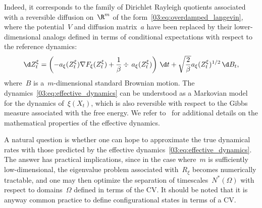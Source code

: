     Indeed, it corresponds to the family of Dirichlet Rayleigh quotients associated with a reversible diffusion on~$\R^m$ of the form~\eqref{03:eq:overdamped_langevin}, where the potential~$V$ and diffusion matrix~$a$ have been replaced by their lower-dimensional analogs defined in terms of conditional expectations with respect to the reference dynamics:
    \begin{equation}
        \label{03:eq:effective_dynamics}
        \d Z_t^\xi = \left(-a_\xi(Z_t^\xi)\nabla F_\xi(Z^\xi_t) + \frac1\beta\div\,a_\xi(Z_t^\xi)\right)\,\d t + \sqrt{\frac{2}\beta}a_\xi(Z_t^\xi)^{1/2}\,\d B_t,
    \end{equation}
    where~$B$ is a~$m$-dimensional standard Brownian motion. The dynamics~\eqref{03:eq:effective_dynamics} can be understood as a Markovian model for the dynamics of~$\xi(X_t)$, which is also reversible with respect to the Gibbs measure associated with the free energy.
    We refer to~\cite{LL10,ZHS16} for additional details on the mathematical properties of the effective dynamics.

    A natural question is whether one can hope to approximate the true dynamical rates with those predicted by the effective dynamics~\eqref{03:eq:effective_dynamics}.
    The answer has practical implications, since in the case where~$m$ is sufficiently low-dimensional, the eigenvalue problem associated with~$R_\xi$ becomes numerically tractable, and one may then optimize the separation of timescales~$N^*(\Omega)$ with respect to domains~$\Omega$ defined in terms of the CV.
    It should be noted that it is anyway common practice to define configurational states in terms of a CV.

